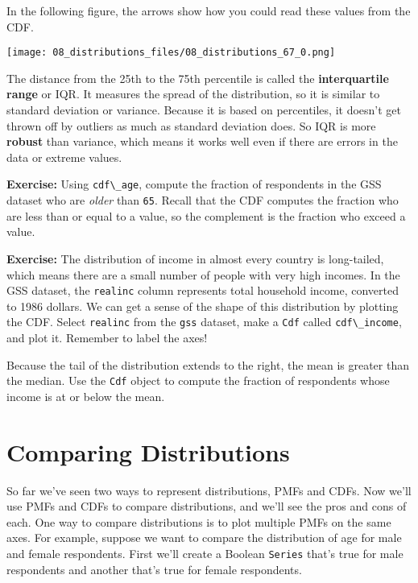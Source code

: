 In the following figure, the arrows show how you could read these values
from the CDF.



\begin{center}
\texttt{[image: 08\_distributions\_files/08\_distributions\_67\_0.png]}
\end{center}

The distance from the 25th to the 75th percentile is called the
\textbf{interquartile range} or IQR. It measures the spread of the
distribution, so it is similar to standard deviation or variance.
Because it is based on percentiles, it doesn't get thrown off by
outliers as much as standard deviation does. So IQR is more
\textbf{robust} than variance, which means it works well even if there
are errors in the data or extreme values.

\textbf{Exercise:} Using \passthrough{\lstinline!cdf\_age!}, compute the
fraction of respondents in the GSS dataset who are \emph{older} than
\passthrough{\lstinline!65!}. Recall that the CDF computes the fraction
who are less than or equal to a value, so the complement is the fraction
who exceed a value.

\textbf{Exercise:} The distribution of income in almost every country is
long-tailed, which means there are a small number of people with very
high incomes. In the GSS dataset, the \passthrough{\lstinline!realinc!}
column represents total household income, converted to 1986 dollars. We
can get a sense of the shape of this distribution by plotting the CDF.
Select \passthrough{\lstinline!realinc!} from the
\passthrough{\lstinline!gss!} dataset, make a
\passthrough{\lstinline!Cdf!} called
\passthrough{\lstinline!cdf\_income!}, and plot it. Remember to label
the axes!

Because the tail of the distribution extends to the right, the mean is
greater than the median. Use the \passthrough{\lstinline!Cdf!} object to
compute the fraction of respondents whose income is at or below the
mean.

\section{Comparing Distributions}\label{comparing-distributions}

So far we've seen two ways to represent distributions, PMFs and CDFs.
Now we'll use PMFs and CDFs to compare distributions, and we'll see the
pros and cons of each. One way to compare distributions is to plot
multiple PMFs on the same axes. For example, suppose we want to compare
the distribution of age for male and female respondents. First we'll
create a Boolean \passthrough{\lstinline!Series!} that's true for male
respondents and another that's true for female respondents.

